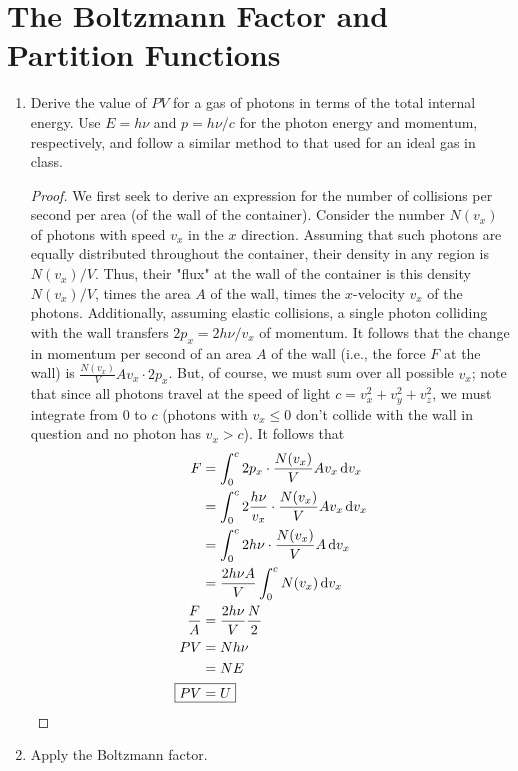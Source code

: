 \documentclass[../psets.tex]{subfiles}
\begin{document}
\section{The Boltzmann Factor and Partition Functions}
\begin{enumerate}
    \item {}Derive the value of $PV$ for a gas of photons in terms of the total internal energy. Use $E=h\nu$ and $p=h\nu/c$ for the photon energy and momentum, respectively, and follow a similar method to that used for an ideal gas in class.
    \begin{proof}
        We first seek to derive an expression for the number of collisions per second per area (of the wall of the container). Consider the number $N(v_x)$ of photons with speed $v_x$ in the $x$ direction. Assuming that such photons are equally distributed throughout the container, their density in any region is $N(v_x)/V$. Thus, their "flux" at the wall of the container is this density $N(v_x)/V$, times the area $A$ of the wall, times the $x$-velocity $v_x$ of the photons. Additionally, assuming elastic collisions, a single photon colliding with the wall transfers $2p_x=2h\nu/v_x$ of momentum. It follows that the change in momentum per second of an area $A$ of the wall (i.e., the force $F$ at the wall) is $\frac{N(v_x)}{V}Av_x\cdot 2p_x$. But, of course, we must sum over all possible $v_x$; note that since all photons travel at the speed of light $c=v_x^2+v_y^2+v_z^2$, we must integrate from 0 to $c$ (photons with $v_x\leq 0$ don't collide with the wall in question and no photon has $v_x>c$). It follows that
        \begin{align*}
            F &= \int_0^c2p_x\cdot\frac{N(v_x)}{V}Av_x\dd{v_x}\\
            &= \int_0^c2\frac{h\nu}{v_x}\cdot\frac{N(v_x)}{V}Av_x\dd{v_x}\\
            &= \int_0^c2h\nu\cdot\frac{N(v_x)}{V}A\dd{v_x}\\
            &= \frac{2h\nu A}{V}\int_0^cN(v_x)\dd{v_x}\\
            \frac{F}{A} &= \frac{2h\nu}{V}\frac{N}{2}\\
            PV &= Nh\nu\\
            &= NE\\
            \Aboxed{PV &= U}
        \end{align*}
    \end{proof}
    \item Apply the Boltzmann factor.
    \begin{enumerate}

\end{enumerate}
\end{enumerate}
\end{document}
